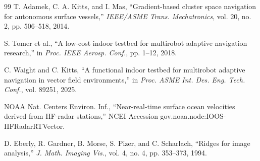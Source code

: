 \documentclass[lettersize,journal]{IEEEtran}
\begin{document}
\begin{thebibliography}{99}
 T. Adamek, C. A. Kitts, and I. Mas, ``Gradient-based cluster space
navigation for autonomous surface vessels,'' \textit{IEEE/ASME Trans.
Mechatronics}, vol. 20, no. 2, pp. 506--518, 2014.

 S. Tomer et al., ``A low-cost indoor testbed for multirobot
adaptive navigation research,'' in \textit{Proc. IEEE Aerosp. Conf.},
pp. 1--12, 2018.

 C. Waight and C. Kitts, ``A functional indoor testbed for
multirobot adaptive navigation in vector field environments,'' in
\textit{Proc. ASME Int. Des. Eng. Tech. Conf.}, vol. 89251, 2025.

 NOAA Nat. Centers Environ. Inf., ``Near-real-time surface
ocean velocities derived from HF-radar stations,'' NCEI Accession
gov.noaa.nodc:IOOS-HFRadarRTVector.

 D. Eberly, R. Gardner, B. Morse, S. Pizer, and C.
Scharlach, ``Ridges for image analysis,'' \textit{J. Math. Imaging Vis.},
vol. 4, no. 4, pp. 353--373, 1994.

\end{thebibliography}
\end{document}
